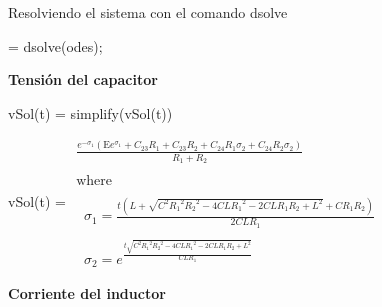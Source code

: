 \documentclass[10pt,a4paper]{article} %
\begin{document}
\begin{par}
	\begin{flushleft}
		Resolviendo el sistema con el comando dsolve
	\end{flushleft}
\end{par}

\begin{matlabcode}
	 = dsolve(odes);
\end{matlabcode}

\begin{par}
	\begin{flushleft}
		\textbf{Tensión del capacitor}
	\end{flushleft}
\end{par}

\begin{matlabcode}
	vSol(t) = simplify(vSol(t))
\end{matlabcode}
\begin{matlabsymbolicoutput}
	vSol(t) = 
	$\displaystyle \begin{array}{l}
	\frac{e^{-\sigma_1 }  {\left(\textrm{E} e^{\sigma_1 } +C_{23}  R_1 +C_{23}  R_2 +C_{24}  R_1  \sigma_2 +C_{24}  R_2  \sigma_2 \right)}}{R_1 +R_2 }\\
	\mathrm{}\\
	\textrm{where}\\
	\mathrm{}\\
	\;\;\sigma_1 =\frac{t {\left(L+\sqrt{C^2  {R_1 }^2  {R_2 }^2 -4 C L {R_1 }^2 -2 C L R_1  R_2 +L^2 }+C R_1  R_2 \right)}}{2 C L R_1 }\\
	\mathrm{}\\
	\;\;\sigma_2 =e^{\frac{t \sqrt{C^2  {R_1 }^2  {R_2 }^2 -4 C L {R_1 }^2 -2 C L R_1  R_2 +L^2 }}{C L R_1 }} 
	\end{array}$
\end{matlabsymbolicoutput}

\begin{par}
	\begin{flushleft}
		\textbf{Corriente del inductor}
	\end{flushleft}
\end{par}
\end{document}
